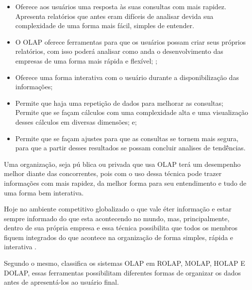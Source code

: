 \begin{itemize}
    
    \item Oferece aos usu\'{a}rios uma resposta \`{a}s suas consultas com mais rapidez. Apresenta relat\'{o}rios que antes eram dif\'{i}ceis de analisar devida sua complexidade de uma forma mais f\'{a}cil, simples de entender.
    
    \item O OLAP oferece ferramentas para que os usu\'{a}rios possam criar seus pr\'{o}prios relat\'{o}rios, com isso poder\'{a} analisar como anda o desenvolvimento das empresas de uma forma mais r\'{a}pida e flex\'{i}vel; \cite{bi-larson-2006};
    
    \item Oferece uma forma interativa com o usu\'{a}rio durante a disponibiliza\c{c}\~{a}o das informa\c{c}\~{o}es;
    
    \item Permite que haja uma repeti\c{c}\~{a}o de dados para melhorar as consultas;
    Permite que se fa\c{c}am c\'{a}lculos com uma complexidade alta e uma visualiza\c{c}\~{a}o desses c\'{a}lculos em diversas dimens\~{o}es; e;
    
    \item Permite que se fa\c{c}am ajustes para que as consultas se tornem mais segura, para que a partir desses resultados se possam concluir analises de tend\^{e}̂ncias.

\end{itemize}

Uma organiza\c{c}\~{a}o, seja p\'{u} blica ou privada que usa OLAP ter\'{a} um desempenho melhor diante das concorrentes, pois com o uso dessa t\'{e}cnica pode trazer informa\c{c}\~{o}es com mais rapidez, da melhor forma para seu entendimento e tudo de uma forma bem interativa. 

Hoje no ambiente competitivo globalizado o que vale \'{e}ter informa\c{c}\~{a}o e estar sempre informado do que esta acontecendo no mundo, mas, principalmente, dentro de sua pr\'{o}pria empresa e essa t\'{e}cnica possibilita que todos os membros fiquem integrados do que acontece na organiza\c{c}\~{a}o de forma simples, r\'{a}pida e interativa \cite{olap-jacobson-misner-2007}.

Segundo \cite{dw-kimball-2013} o mesmo, classifica os sistemas OLAP em ROLAP, MOLAP, HOLAP E DOLAP, essas ferramentas possibilitam diferentes formas de organizar os dados antes de apresent\'{a}-los ao usu\'{a}rio final.

